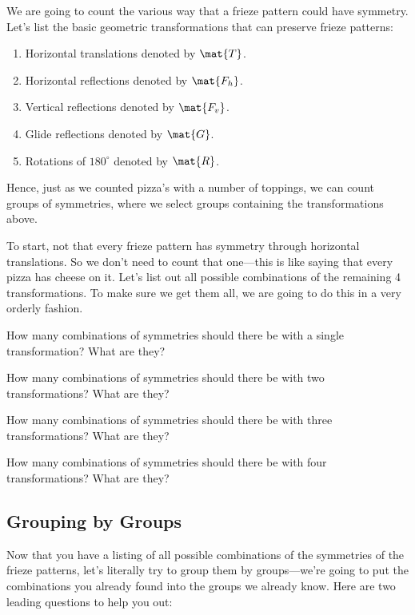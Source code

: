We are going to count the various way that a frieze pattern could have
symmetry. Let's list the basic geometric transformations that can
preserve frieze patterns:
\begin{enumerate}
\item Horizontal translations denoted by $\mat{T}$.
\item Horizontal reflections denoted by $\mat{F_h}$.
\item Vertical reflections denoted by $\mat{F_v}$.
\item Glide reflections denoted by $\mat{G}$.
\item Rotations of $180^\circ$ denoted by $\mat{R}$.
\end{enumerate}
Hence, just as we counted pizza's with a number of toppings, we can
count groups of symmetries, where we select groups containing the
transformations above.

To start, not that every frieze pattern has symmetry through horizontal
translations. So we don't need to count that one---this is like saying
that every pizza has cheese on it. Let's list out all possible combinations
of the remaining 4 transformations. To make sure we get them all, we are
going to do this in a very orderly fashion.

\begin{ques} 
How many combinations of symmetries should there be with a single
transformation?  What are they?
\end{ques}
\QM

\begin{ques} 
How many combinations of symmetries should there be with two
transformations?  What are they?
\end{ques}
\QM

\begin{ques} 
How many combinations of symmetries should there be with three
transformations?  What are they?
\end{ques}
\QM

\begin{ques} 
How many combinations of symmetries should there be with four
transformations?  What are they?
\end{ques}
\QM



\subsection{Grouping by Groups}

Now that you have a listing of all possible combinations of the
symmetries of the frieze patterns, let's literally try to group them
by groups---we're going to put the combinations you already found into
the groups we already know. Here are two leading questions to help you
out:

